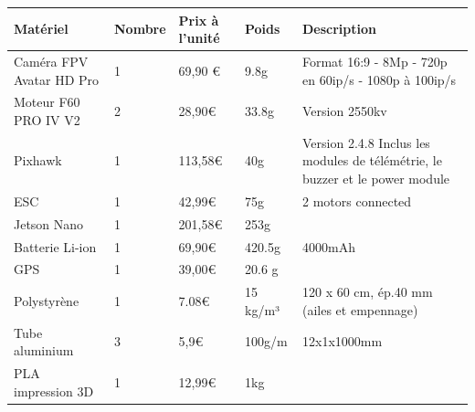 \documentclass[a4paper,12pt,french]{report}
\begin{document}
\begin{table}[h]
    \begin{tabularx}{18cm}{|l|l|p{2cm}|l|X|}
        \hline
        \textbf{Matériel}        & \textbf{Nombre} & \textbf{Prix à l'unité} & \textbf{Poids} & \textbf{Description}                       \\
        \hline
        Caméra FPV Avatar HD Pro & 1               & 69,90 €                 & 9.8g           & Format 16:9 -
        8Mp - 720p en 60ip/s - 1080p à 100ip/s                                                                                             \\
        \hline
        Moteur F60 PRO IV V2     & 2               & 28,90€                  & 33.8g          & Version 2550kv                             \\
        \hline
        Pixhawk                  & 1               & 113,58€                 & 40g            & Version 2.4.8
        Inclus les modules de télémétrie, le buzzer et le power module                                                                     \\
        \hline
        ESC                      & 1               & 42,99€                  & 75g            & 2 motors connected                         \\
        \hline
        Jetson Nano              & 1               & 201,58€                 & 253g           &                                            \\
        \hline
        Batterie Li-ion          & 1               & 69,90€                  & 420.5g         & 4000mAh                                    \\
        \hline
        GPS                      & 1               & 39,00€                  & 20.6 g         &                                            \\
        \hline
        Polystyrène              & 1               & 7.08€                   & 15 kg/m³       & 120 x 60 cm, ép.40 mm (ailes et empennage) \\
        \hline
        Tube aluminium           & 3               & 5,9€                    & 100g/m         & 12x1x1000mm                                \\
        \hline
        PLA impression 3D        & 1               & 12,99€                  & 1kg            &                                            \\
        \hline
    \end{tabularx}
\end{table}
\end{document}
